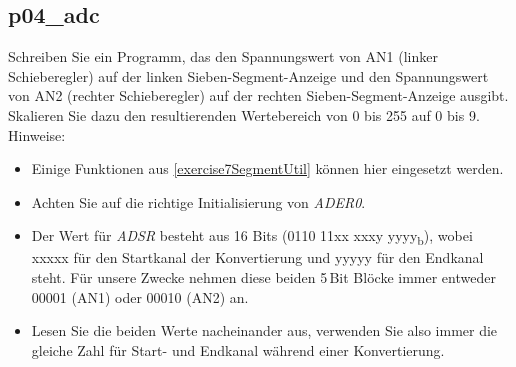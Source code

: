 \documentclass[
  accentcolor=tud1c,	%
  colorbacktitle,		%
  inverttitle,			%
  german,				%
  twoside
]{tudexercise}
\begin{document}
\subsection{p04\_adc}
Schreiben Sie ein Programm, das den Spannungswert von AN1 (linker Schieberegler) auf der linken Sieben-Segment-Anzeige und den Spannungswert von AN2 (rechter Schieberegler) auf der rechten Sieben-Segment-Anzeige ausgibt. Skalieren Sie dazu den resultierenden Wertebereich von 0 bis 255 auf 0 bis 9.\\
Hinweise:
\begin{itemize}
\item Einige Funktionen aus \ref{exercise7SegmentUtil} können hier eingesetzt werden.

\item Achten Sie auf die richtige Initialisierung von \textit{ADER0}.

\item Der Wert für \textit{ADSR} besteht aus 16 Bits (0110 11xx xxxy yyyy\textsubscript{b}), wobei xxxxx für den Startkanal der Konvertierung und yyyyy für den Endkanal steht. Für unsere Zwecke nehmen diese beiden 5\,Bit Blöcke immer entweder 00001 (AN1) oder 00010 (AN2) an.

\item Lesen Sie die beiden Werte nacheinander aus, verwenden Sie also immer die gleiche Zahl für Start- und Endkanal während einer Konvertierung.

\end{itemize}
\end{document}
